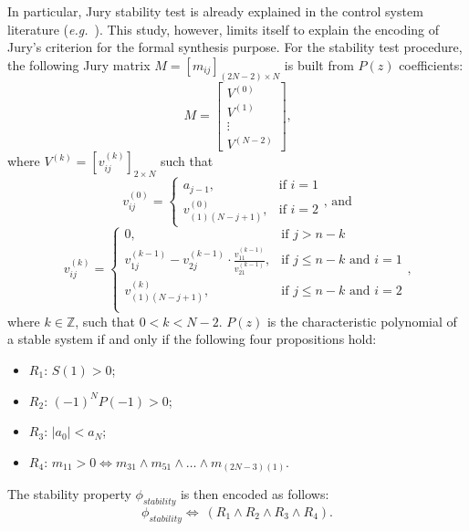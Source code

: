 \documentclass[runningheads,a4paper]{llncs}
\begin{document}
In particular, Jury stability test is already explained in the control system 
literature ({\it e.g.}~\cite{fadali}). This study, however, limits itself to 
explain the encoding of Jury's criterion for the formal synthesis purpose. 
For the stability  test procedure, the following Jury matrix 
$M=[m_{ij}]_{(2N-2)\times N}$ is built  from $P(z)$ coefficients:
$$
M=\left[
\begin{matrix}
  V^{(0)} \\
  V^{(1)} \\
  \vdots \\
  V^{(N-2)}
 \end{matrix}
\right]\mbox{,}
$$
\noindent where $V^{(k)}=[v^{(k)}_{ij}]_{2\times N}$ such that
$$
v^{(0)}_{ij}=\begin{cases} 
a_{j-1}, & \mbox{if } i=1 \\   v^{(0)}_{(1)(N-j+1)}, & \mbox{if } i=2 
\end{cases}\mbox{, and} 
$$
$$
v^{(k)}_{ij}=\begin{cases} 
0, & \mbox{if } j>n-k\\
v^{(k-1)}_{1j}-v^{(k-1)}_{2j}\cdot\frac{v^{(k-1)}_{11}}{v^{(k-1)}_{21}}, & \mbox{if } j\leq n-k  \mbox{ and } i=1 \\
v^{(k)}_{(1)(N-j+1)}, & \mbox{if } j\leq n-k \mbox{ and } i=2 \\
\end{cases} \mbox{,}
$$
\noindent where $k\in\mathbb{Z}$, such that $0<k<N-2$. $P(z)$ is the 
characteristic polynomial of a stable system if and only if the following 
four propositions hold:
\begin{itemize}
\item $R_{1}$: $S(1)>0$;
\item $R_{2}$: $(-1)^{N}P(-1)>0$;
\item $R_{3}$: $\vert{a_{0}}\vert <a_{N}$;
\item $R_{4}$: $m_{11}>0\iff m_{31}\wedge m_{51}\wedge \dots \wedge m_{(2N-3)(1)}$.
\end{itemize}

The stability property $\phi_{stability}$ is then encoded as follows:
$$
\phi_{stability}\iff \ (R_{1} \wedge R_{2} \wedge R_{3} \wedge R_{4}).
$$
\end{document}
